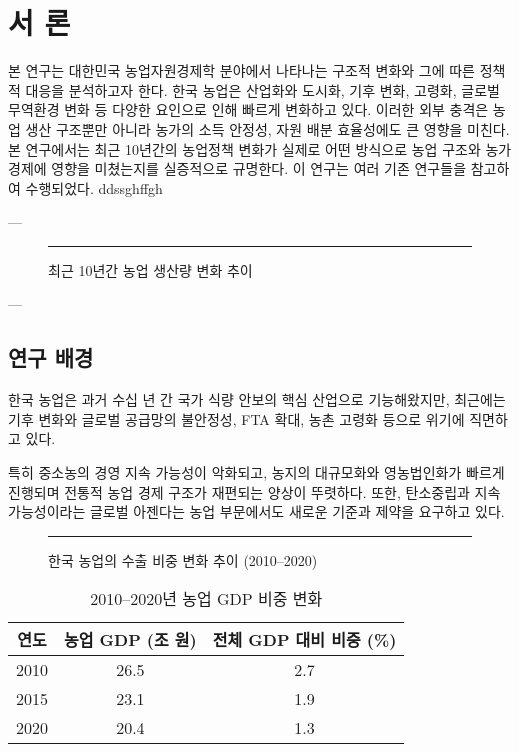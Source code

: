 \chapter{서 론}



본 연구는 대한민국 농업자원경제학 분야에서 나타나는 구조적 변화와 그에 따른 정책적 대응을 분석하고자 한다.  
한국 농업은 산업화와 도시화, 기후 변화, 고령화, 글로벌 무역환경 변화 등 다양한 요인으로 인해 빠르게 변화하고 있다.  
이러한 외부 충격은 농업 생산 구조뿐만 아니라 농가의 소득 안정성, 자원 배분 효율성에도 큰 영향을 미친다.  
본 연구에서는 최근 10년간의 농업정책 변화가 실제로 어떤 방식으로 농업 구조와 농가 경제에 영향을 미쳤는지를 실증적으로 규명한다.
이 연구는 여러 기존 연구들\cite{hong2020latex,doe2019intro}을 참고하여 수행되었다.
ddssghffgh

---

\begin{figure}[htbp]
  \centering
  \caption{최근 10년간 농업 생산량 변화 추이}\label{fig:chapter1_1}

  \rule{0.7\linewidth}{5cm} %
\end{figure}

---

\section{연구 배경}

한국 농업은 과거 수십 년 간 국가 식량 안보의 핵심 산업으로 기능해왔지만,  
최근에는 기후 변화와 글로벌 공급망의 불안정성, FTA 확대, 농촌 고령화 등으로 위기에 직면하고 있다.  

특히 중소농의 경영 지속 가능성이 악화되고, 농지의 대규모화와 영농법인화가 빠르게 진행되며  
전통적 농업 경제 구조가 재편되는 양상이 뚜렷하다. 또한, 탄소중립과 지속가능성이라는 글로벌 아젠다는  
농업 부문에서도 새로운 기준과 제약을 요구하고 있다.

\begin{figure}[htbp]
  \centering
  \rule{0.65\linewidth}{5cm}
  \caption{한국 농업의 수출 비중 변화 추이 (2010–2020)}\label{fig:chapter1_2}
\end{figure}

\begin{table}[htbp]
  \centering
  \begin{tabular}{|c|c|c|}
    \hline
    연도 & 농업 GDP (조 원) & 전체 GDP 대비 비중 (\%) \\
    \hline
    2010 & 26.5 & 2.7 \\
    2015 & 23.1 & 1.9 \\
    2020 & 20.4 & 1.3 \\
    \hline
  \end{tabular}
  \caption{2010–2020년 농업 GDP 비중 변화}\label{tab:chapter1_1}
\end{table}



